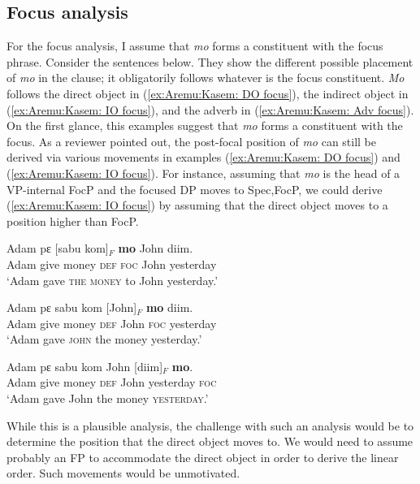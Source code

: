 \documentclass[output=paper,colorlinks,citecolor=brown,draftmode
]{langscibook}
\begin{document}
\subsection{Focus analysis}

For the focus analysis, I assume that \textit{mo} forms a constituent with the focus phrase. Consider the sentences below. They show the different possible placement of \textit{mo} in the clause; it obligatorily follows whatever is the focus constituent. \textit{Mo} follows the direct object in (\ref{ex:Aremu:Kasem: DO focus}), the indirect object in (\ref{ex:Aremu:Kasem: IO focus}), and the adverb in (\ref{ex:Aremu:Kasem: Adv focus}). On the first glance, this examples suggest that \textit{mo} forms a constituent with the focus. As a reviewer pointed out, the post-focal position of \textit{mo} can still be derived via various movements in examples (\ref{ex:Aremu:Kasem: DO focus}) and (\ref{ex:Aremu:Kasem: IO focus}). For instance, assuming that \textit{mo} is the head of a VP-internal FocP and the focused DP moves to Spec,FocP, we could derive (\ref{ex:Aremu:Kasem: IO focus}) by assuming that the direct object moves to a position higher than FocP.



\ea \label{ex:Aremu:Const}
\begin{xlist}

\ex \label{ex:Aremu:Kasem: DO focus}
\gll Adam pɛ [sabu kom]$_F$ \textbf{mo} John diim.\\
	Adam give money \textsc{def} \textsc{foc} John yesterday\\
\glt  `Adam gave \textsc{the money} to John yesterday.'
    
\ex \label{ex:Aremu:Kasem: IO focus}
\gll Adam pɛ sabu kom [John]$_F$ \textbf{mo} diim.\\
	Adam give money \textsc{def} John \textsc{foc} yesterday\\
\glt `Adam gave \textsc{john} the money yesterday.'

\ex \label{ex:Aremu:Kasem: Adv focus}
\gll Adam pɛ sabu kom John [diim]$_F$ \textbf{mo}.\\
	Adam give money \textsc{def} John yesterday \textsc{foc}\\
\glt `Adam gave John the money \textsc{yesterday}.'

\end{xlist}
\z 


While this is a plausible analysis, the challenge with such an analysis would be to determine the position that the direct object moves to. We would need to assume probably an FP to accommodate the direct object in order to derive the linear order. Such movements would be unmotivated.
\end{document}
